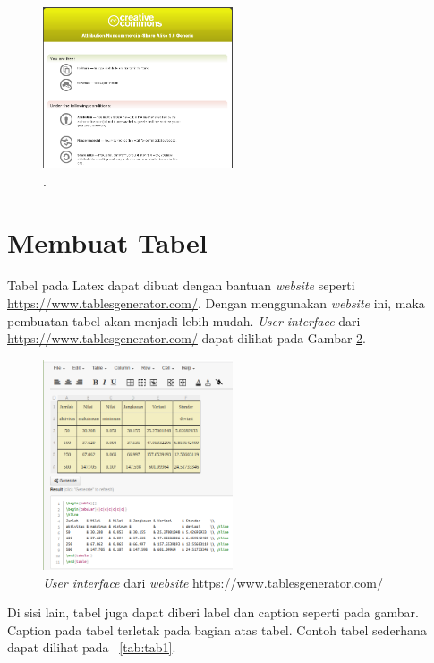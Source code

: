 \begin{figure}
	\centering
	\includegraphics[width=0.50\textwidth]
	{assets/pics/creative_commons.png}
	\caption{\license.}
	\label{fig:testGambar}
\end{figure}


\section{Membuat Tabel}
\label{sec:latexTable}
Tabel pada Latex dapat dibuat dengan bantuan \textit{website} seperti \url{https://www.tablesgenerator.com/}.
Dengan menggunakan \textit{website} ini, maka pembuatan tabel akan menjadi lebih mudah.
\textit{User interface} dari \url{https://www.tablesgenerator.com/} dapat dilihat pada Gambar \ref{fig:tablesgenerator}.

\begin{figure}
	\centering
	\includegraphics[width=0.5\textwidth]{assets/pics/tablesgenerator-dot-com.png}
	\caption{\textit{User interface} dari \textit{website} https://www.tablesgenerator.com/}
	\label{fig:tablesgenerator}
\end{figure}

Di sisi lain, tabel juga dapat diberi label dan caption seperti pada gambar.
Caption pada tabel terletak pada bagian atas tabel.
Contoh tabel sederhana dapat dilihat pada \tab~\ref{tab:tab1}.


